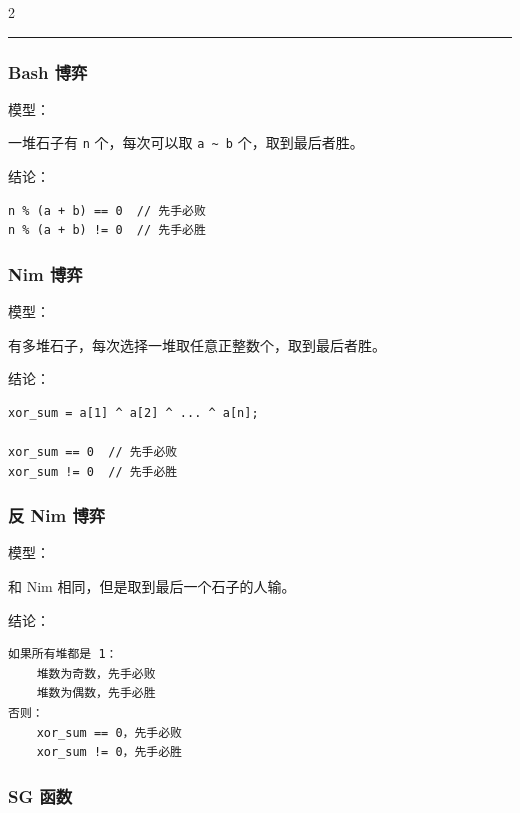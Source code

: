 \documentclass[10pt]{article}
\begin{document}
\begin{multicols*}{2}
\noindent\rule{\linewidth}{0.4pt}\par


\subsubsection{Bash 博弈}


模型： \par

一堆石子有 \texttt{n} 个，每次可以取 \texttt{a \textasciitilde{} b} 个，取到最后者胜。 \par

结论： \par

\begin{verbatim}
n % (a + b) == 0  // 先手必败
n % (a + b) != 0  // 先手必胜
\end{verbatim}


\subsubsection{Nim 博弈}


模型： \par

有多堆石子，每次选择一堆取任意正整数个，取到最后者胜。 \par

结论： \par

\begin{verbatim}
xor_sum = a[1] ^ a[2] ^ ... ^ a[n];

xor_sum == 0  // 先手必败
xor_sum != 0  // 先手必胜
\end{verbatim}


\subsubsection{反 Nim 博弈}


模型： \par

和 Nim 相同，但是取到最后一个石子的人输。 \par

结论： \par

\begin{verbatim}
如果所有堆都是 1：
    堆数为奇数，先手必败
    堆数为偶数，先手必胜
否则：
    xor_sum == 0，先手必败
    xor_sum != 0，先手必胜
\end{verbatim}


\subsubsection{SG 函数}



\end{multicols*}
\end{document}
